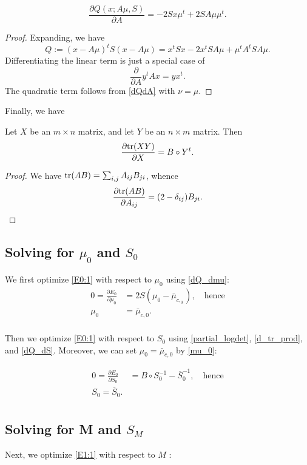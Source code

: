 \documentclass[12pt,leqno]{article}
\begin{document}
\begin{Cor}\label{dM}
  $$
  \frac{\partial{Q(x;A\mu,S)}}{\partial{A}} = -2Sx\mu^t + 2SA\mu\mu^t.
  $$
\end{Cor}
\begin{proof}
Expanding, we have
$$
Q := (x-A\mu)^tS(x-A\mu) = x^tSx - 2x^tSA\mu + \mu^tA^tSA\mu.
$$
Differentiating the linear term is just a special case of
$$
\frac{\partial}{\partial{A}}y^tAx = yx^t.
$$
The quadratic term follows from \eqref{dQdA} with $\nu = \mu$.
\end{proof}
Finally, we have
\begin{Lem} \label{d_tr_prod}Let $X$ be an $m\times{n}$ matrix, and let $Y$ be an $n\times{m}$ matrix.
  Then
  $$
  \frac{\partial\text{\rm tr}(XY)}{\partial{X}} = B\circ{Y^t}.
  $$
\end{Lem}
\begin{proof}
  We have $ \text{\rm tr}(AB) = \sum_{i,j}A_{ij}B_{ji}$, whence
  $$
  \frac{\partial\text{\rm tr}(AB)}{\partial{A_{ij}}} = (2-\delta_{ij})B_{ji}.
  $$
  \end{proof}

\subsection{Solving for  $\mu_0$ and $S_0$}
We first optimize \eqref{E0:1} with respect to $\mu_0$ using \eqref{dQ_dmu}:
\begin{equation} \label{mu_0}
  \begin{split}
  0 = \frac{\partial{E_0}}{\partial{\mu_0}} &= 2S(\mu_0-\bar{\mu}_{c,_0}),\quad\text{hence}\\
    \mu_0 &= \bar{\mu}_{c,0}.\\
  \end{split}
\end{equation}

Then we optimize \eqref{E0:1} with respect to $S_0$ using \eqref{partial_logdet}, \eqref{d_tr_prod}, and \eqref{dQ_dS}. Moreover,
we can set $\mu_0 = \bar{\mu}_{c,0}$ by \eqref{mu_0}:

\begin{equation}\label{S_0}
  \begin{split}
  0 = \frac{\partial{E_0}}{\partial{S_0}} &= B\circ{S_0^{-1}}-\overline{S}_0^{-1}, \quad\text{hence}\\
  S_0 = \overline{S}_0.\\
  \end{split}
\end{equation}


\subsection{Solving for M and $S_M$}
Next, we optimize \eqref{E1:1} with respect to $M$ :
\end{document}
